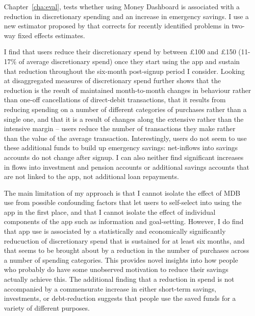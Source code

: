Chapter~\ref{cha:eval}, tests whether using Money Dashboard is associated with
a reduction in discretionary spending and an increase in emergency savings. I
use a new estimator proposed by \citet{callaway2021difference} that corrects
for recently identified problems in two-way fixed effects estimates.

I find that users reduce their discretionary spend by between \pounds100 and
\pounds150 (11-17\% of average discretionary spend) once they start using the
app and sustain that reduction throughout the six-month post-signup period I
consider. Looking at disaggregated measures of discretionary spend further
shows that the reduction is the result of maintained month-to-month changes in
behaviour rather than one-off cancellations of direct-debit transactions, that
it results from reducing spending on a number of different categories of
purchases rather than a single one, and that it is a result of changes along
the extensive rather than the intensive margin -- users reduce the number of
transactions they make rather than the value of the average transaction.
Interestingly, users do not seem to use these additional funds to build up
emergency savings: net-inflows into savings accounts do not change after
signup. I can also neither find significant increases in flows into investment
and pension accounts or additional savings accounts that are not linked to the
app, not additional loan repayments.

The main limitation of my approach is that I cannot isolate the effect of MDB
use from possible confounding factors that let users to self-select into using
the app in the first place, and that I cannot isolate the effect of individual
components of the app such as information and goal-setting. However, I do find
that app use is associated by a statistically and economically significantly
reducuction of discretionary spend that is sustained for at least six months,
and that seems to be brought about by a reduction in the number of purchases
across a number of spending categories. This provides novel insights into how
people who probably do have some unobserved motivation to reduce their savings
actually achieve this. The additional finding that a reduction in spend is not
accompanied by a commensurate increase in either short-term savings,
investments, or debt-reduction suggests that people use the saved funds for a
variety of different purposes.

